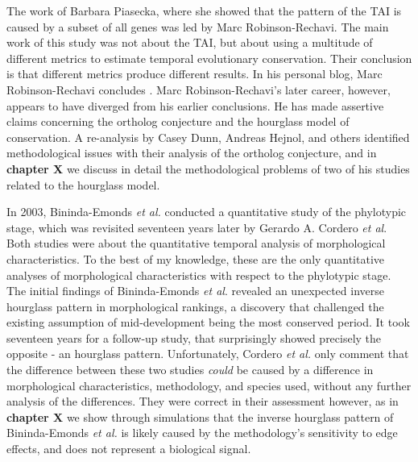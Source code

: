 The work of Barbara Piasecka, where she showed that the pattern of the TAI is caused by a subset of all genes was led by Marc Robinson-Rechavi. The main work of this study was not about the TAI, but about using a multitude of different metrics to estimate temporal evolutionary conservation. Their conclusion is that different metrics produce different results. In his personal blog, Marc Robinson-Rechavi concludes \cite{robinsonrechaviblog}. Marc Robinson-Rechavi's later career, however, appears to have diverged from his earlier conclusions. He has made assertive claims concerning the ortholog conjecture\cite{KryuchkovaMostacci2016} and the hourglass model of conservation\cite{Liu2020,Liu2021,marletaz2018}. A re-analysis by Casey Dunn, Andreas Hejnol, and others identified methodological issues with their analysis of the ortholog conjecture\cite{Dunn2018}, and in \textbf{chapter X} we discuss in detail the methodological problems of two of his studies related to the hourglass model.

In 2003, Bininda-Emonds \textit{et al.} conducted a quantitative study of the phylotypic stage, which was revisited seventeen years later by Gerardo A. Cordero \textit{et al}\cite{OlafRP2003, Cordero2020}. Both studies were about the quantitative temporal analysis of morphological characteristics. To the best of my knowledge, these are the only quantitative analyses of morphological characteristics with respect to the phylotypic stage. The initial findings of Bininda-Emonds \textit{et al}. revealed an unexpected inverse hourglass pattern in morphological rankings, a discovery that challenged the existing assumption of mid-development being the most conserved period. It took seventeen years for a follow-up study, that surprisingly showed precisely the opposite - an hourglass pattern. Unfortunately, Cordero \textit{et al.} only comment that the difference between these two studies \textit{could} be caused by a difference in morphological characteristics, methodology, and species used, without any further analysis of the differences. They were correct in their assessment however, as in \textbf{chapter X} we show through simulations that the inverse hourglass pattern of Bininda-Emonds \textit{et al.} is likely caused by the methodology's sensitivity to edge effects, and does not represent a biological signal.

